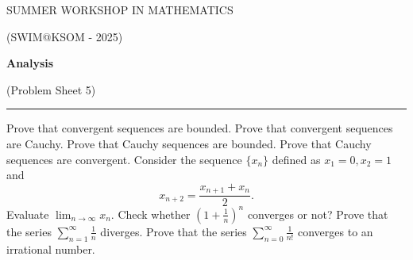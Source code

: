 \documentclass[fleqn]{exam}
\begin{document}
\begin{center}
	{\huge SUMMER WORKSHOP IN MATHEMATICS}
	
	\bigskip
	
	{\large (SWIM@KSOM - 2025)}
	
	\bigskip


	\textbf{\Large Analysis}
	
	\medskip

	{\large (Problem Sheet 5)}

	\medskip
	
	\hrule
\end{center}


\begin{questions}
	\question Prove that convergent sequences are bounded.
	\question Prove that convergent sequences are Cauchy.
	\question Prove that Cauchy sequences are bounded.
	\question Prove that Cauchy sequences are convergent.
	\question Consider the sequence $\{x_n\}$ defined as $x_1=0,x_2=1$ and 
	\[x_{n+2}=\frac{x_{n+1}+x_{n}}{2}.\]
	Evaluate $\lim_{n\to\infty} x_n$.
	\question Check whether $\left(1+\frac{1}{n}\right)^n$ converges or not?
	\question Prove that the series $\sum_{n=1}^\infty\frac{1}{n}$ diverges.
	\question Prove that the series $\sum_{n=0}^\infty\frac{1}{n!}$ converges to an irrational number.
\end{questions}
\end{document}
